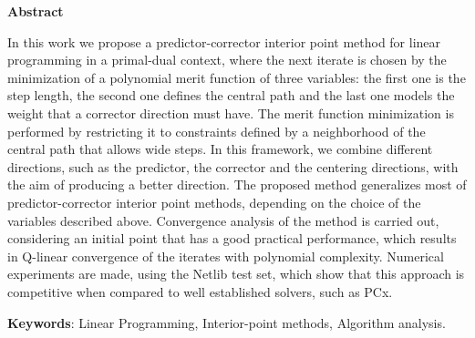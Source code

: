 \vfill
\begin{center}
  \large{\textbf{Abstract}}
\end{center}
\onehalfspacing
{}



In this work we propose a predictor-corrector interior point method for linear programming in a primal-dual context, where the next iterate is chosen by the minimization of a polynomial merit function  of three variables: the first one is the step length, the second one defines the central path and the last one models the weight that a corrector direction must have. The merit function minimization is performed by restricting it to constraints defined by a neighborhood of the central path that allows wide steps. In this framework, we combine  different directions, such as the predictor, the corrector and the centering directions, with the aim of producing a better direction. The proposed method generalizes most of predictor-corrector interior point methods, depending on the choice of the variables described above. Convergence analysis of the method is carried out,  considering an initial point that has a good practical performance, which results in Q-linear convergence of the iterates with polynomial complexity. Numerical experiments are made, using the Netlib test set, which show that this approach is competitive when compared to  well established solvers, such as PCx.






\textbf{Keywords}:
Linear Programming, Interior-point methods,  Algorithm analysis.
